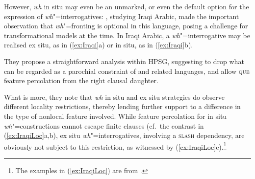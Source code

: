 \documentclass[output=paper,biblatex,babelshorthands,newtxmath,draftmode,colorlinks,citecolor=brown]{langscibook}
\begin{document}
However, \emph{wh} in situ may even be an unmarked, or even the default
option for the expression of \emph{wh}"=interrogatives:
\citet[Section~6.2]{Johnson:Lappin:97}, studying Iraqi Arabic, made the important
observation that \emph{wh}"=fronting is optional in this language,
posing a challenge for transformational models at the time.  In Iraqi
Arabic, a \emph{wh}"=interrogative may be realised ex situ, as in
(\ref{ex:Iraqi}a) or in situ, as in (\ref{ex:Iraqi}b).

\eal
\label{ex:Iraqi}
\zl

\noindent
They propose a straightforward analysis within HPSG, suggesting to
drop what can be regarded as a parochial constraint of  and
related languages, and allow \textsc{que} feature percolation from the
right clausal daughter.
 
What is more, they note that \emph{wh} in situ and ex situ strategies
do observe different locality restrictions, thereby lending further
support to a difference in the type of nonlocal feature
involved. While feature percolation for in situ
\emph{wh}"=constructions cannot escape finite clauses (cf.\ the
contrast in (\ref{ex:IraqiLoc}a,b), ex situ \emph{wh}"=interrogatives,
involving a \textsc{slash} dependency, are obviously not subject to
this restriction, as witnessed by (\ref{ex:IraqiLoc}c).\footnote{The examples in (\ref{ex:IraqiLoc}) are from .}


    
\eal \label{ex:IraqiLoc}
\zl
\end{document}
